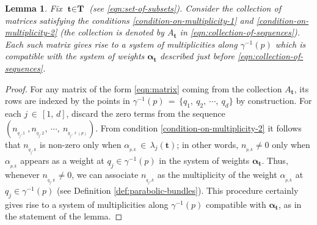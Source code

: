 \documentclass[10pt,reqno]{amsart}
\newtheorem{lemma}[theorem]{Lemma}
\theoremstyle{myroman}
\numberwithin{equation}{section}
\begin{document}
		\begin{lemma}\label{lem:system-of-multiplicities}
			Fix $\textbf{t}\in \textbf{T}$ (see \eqref{eqn:set-of-subsets}). Consider the collection of matrices satisfying the
			conditions \eqref{condition-on-multiplicity-1} and \eqref{condition-on-multiplicity-2} (the collection is denoted by $A_{\textbf{t}}$ in \eqref{eqn:collection-of-sequences}). Each such matrix gives rise to a system of multiplicities along $\gamma^{-1}(p)$ which is compatible with the system of weights $\boldsymbol{\alpha}_{\textbf{t}}$ described just before \eqref{eqn:collection-of-sequences}.
		\end{lemma}
		
		\begin{proof}
			For any matrix of the form \eqref{eqn:matrix} coming from the collection $A_{\textbf{t}}$, its rows are indexed by the points
			in $\gamma^{-1}(p)\,=\,\{q_1,\ q_2,\ \cdots,\ q_d\}$ by construction. 
			For each $j\,\in\,[1,\,d]$, discard the zero terms from the sequence $\left(n_{_{q_j,1}}\ ,n_{_{q_j,2}},\ \cdots,\ 
			n_{_{q_j,\ell(p)}}\right)$. From condition \eqref{condition-on-multiplicity-2} it follows that $n_{_{q_j,k}}$ 
			is non-zero only when $\alpha_{_{p,k}}\,\in\, \lambda_j(\textbf{t})$; in other words, $n_{_{p,k}}\neq 0$ only when $\alpha_{_{p,k}}$ appears as a weight at $q_j\in\gamma^{-1}(p)$ in the system of weights $\boldsymbol{\alpha}_{\textbf{t}}$. 
			Thus, whenever $n_{_{q_j,k}}\neq 0$, we can associate $n_{_{q_j,k}}$ as the multiplicity of the weight $\alpha_{_{p,k}}$ at $q_j\in \gamma^{-1}(p)$ (see Definition \ref{def:parabolic-bundles}). This procedure certainly
			gives rise to a system of multiplicities along $\gamma^{-1}(p)$ compatible with 
			$\boldsymbol{\alpha}_{\textbf{t}}$, as in the statement of the lemma.
		\end{proof}
		
\end{document}
